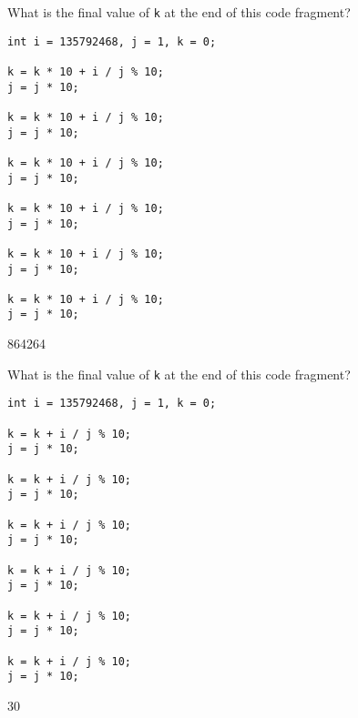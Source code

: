 \nextq
What is the final value of \verb!k! at the end of this code fragment?
\begin{Verbatim}[fontsize=\footnotesize,frame=single]
int i = 135792468, j = 1, k = 0;

k = k * 10 + i / j % 10;
j = j * 10;

k = k * 10 + i / j % 10;
j = j * 10;

k = k * 10 + i / j % 10;
j = j * 10;

k = k * 10 + i / j % 10;
j = j * 10;

k = k * 10 + i / j % 10;
j = j * 10;

k = k * 10 + i / j % 10;
j = j * 10;
\end{Verbatim}
\ANSWER
\begin{answercode}
864264
\end{answercode}

\nextq
What is the final value of \verb!k! at the end of this code fragment?
\begin{Verbatim}[fontsize=\footnotesize,frame=single]
int i = 135792468, j = 1, k = 0;

k = k + i / j % 10;
j = j * 10;

k = k + i / j % 10;
j = j * 10;

k = k + i / j % 10;
j = j * 10;

k = k + i / j % 10;
j = j * 10;

k = k + i / j % 10;
j = j * 10;

k = k + i / j % 10;
j = j * 10;
\end{Verbatim}
\ANSWER
\begin{answercode}
30
\end{answercode}


